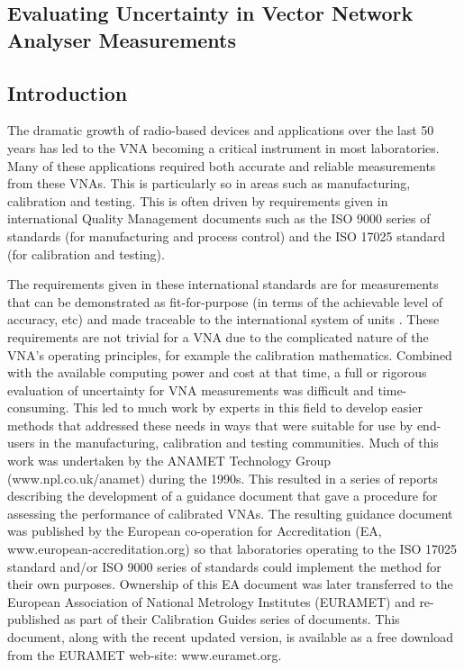 \documentclass[../thesis/thesis.tex]{subfiles}
\begin{document}
	
\onlyinsubfile{\setcounter{chapter}{3}}

\begin{refsection}
\chapter{Evaluating Uncertainty in Vector Network Analyser Measurements}
\section{Introduction}
The dramatic growth of radio-based devices and applications over the last 50 years has led to the VNA becoming a critical instrument in most laboratories. Many of these applications required both accurate and reliable measurements from these VNAs.  This is particularly so in areas such as manufacturing, calibration and testing.  This is often driven by requirements given in international Quality Management documents such as the ISO 9000 series of standards \cite{ISO9000} (for manufacturing and process control) and the ISO 17025 standard \cite{ISO17025} (for calibration and testing).

The requirements given in these international standards are for measurements that can be demonstrated as fit-for-purpose (in terms of the achievable level of accuracy, etc) and made traceable to the international system of units \cite{SI_2019, SI_2019B}.  These requirements are not trivial for a VNA due to the complicated nature of the VNA’s operating principles, for example the calibration mathematics. Combined with the available computing power and cost at that time, a full or rigorous evaluation of uncertainty for VNA measurements was difficult and time-consuming. This led to much work by experts in this field to develop easier methods that addressed these needs in ways that were suitable for use by end-users in the manufacturing, calibration and testing communities.  Much of this work was undertaken by the ANAMET Technology Group (www.npl.co.uk/anamet) during the 1990s.  This resulted in a series of reports \cite{ANAMET_1996, ANAMET_1998, ANAMET_1999} describing the development of a guidance document that gave a procedure for assessing the performance of calibrated VNAs.  The resulting guidance document \cite{EA_2000} was published by the European co-operation for Accreditation (EA, www.european-accreditation.org) so that laboratories operating to the ISO 17025 standard and/or ISO 9000 series of standards could implement the method for their own purposes.  Ownership of this EA document was later transferred to the European Association of National Metrology Institutes (EURAMET) and re-published \cite{EURAMET_2011} as part of their Calibration Guides series of documents. This document, along with the recent updated version, is available as a free download from the EURAMET web-site: www.euramet.org.


\end{refsection}
\end{document}
